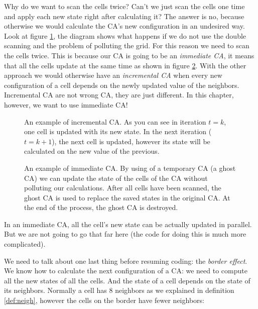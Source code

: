 Why do we want to scan the cells twice? Can't we just scan the cells one time and apply each new state
right after calculating it? The answer is no, because otherwise we would calculate the CA's new configuration
in an undesired way. Look at figure \ref{fig:updatecainc},
the diagram shows what happens if we do not use the double
scanning and the problem of polluting the grid. For this reason we need to scan the cells twice. This is because
our CA is going to be an \textit{immediate CA}, it means that all the cells update at the same time
as shown in figure \ref{fig:updatecaimm}.
With the other
approach we would otherwise have an \textit{incremental CA} when every new configuration of a cell depends on the
newly updated value of the neighbors. Incremental CA are not wrong CA, they are just different. In this chapter,
however, we want to use immediate CA!

%
\begin{figure}[b]
\sidecaption

%
%
\caption{An example of incremental CA. As you can see in iteration $t=k$, one cell is updated
with its new state. In the next iteration ($t=k+1$), the next cell is updated, however its state
will be calculated on the new value of the previous.}
\label{fig:updatecainc}
\end{figure}
%

%
\begin{figure}[b]
\sidecaption

%
%
\caption{An example of immediate CA. By using of a temporary CA (a ghost CA) we can update
the state of the cells of the CA without polluting our calculations. After all cells have been scanned, the
ghost CA is used to replace the saved states in the original CA. At the end of the process, the ghost CA is
destroyed.}
\label{fig:updatecaimm}
\end{figure}
%

In an immediate CA, all the cell's new state can be actually updated in parallel. But we are not going to go
that far here (the code for doing this is much more complicated).

We need to talk about one last thing before resuming coding: the \textit{border effect}. We know how to
calculate the next configuration of a CA: we need to compute all the new states of all the cells. And the state
of a cell depends on the state of its neighbors. Normally a cell has 8 neighbors as we explained in definition
\ref{def:neigh}, however the cells on the border have fewer neighbors:

